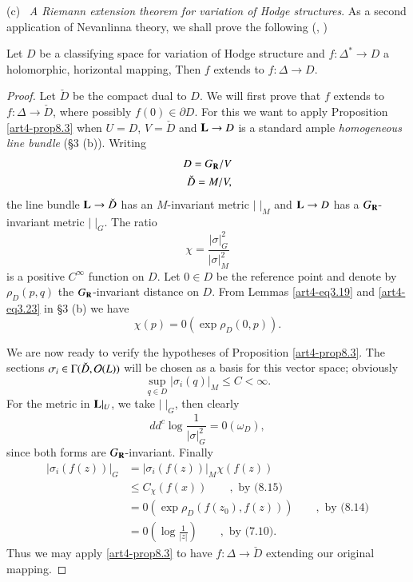 \noindent
(c)~ \textit{A Riemann extension theorem for variation of Hodge structures}. As a second application of Nevanlinna theory, we shall prove the following (\cf \cite{art4-key19}, \cite{art4-key41})

\setcounter{proposition}{12}
\begin{proposition}\label{art4-prop8.13}
Let $D$ be a classifying space for variation of Hodge structure and $f : \Delta^\ast \to D$ a holomorphic, horizontal mapping, Then $f$ extends to $f: \Delta \to D$.
\end{proposition}

\begin{proof}
Let $\check{D}$ be the compact dual to $D$. We will first prove that $f$ extends to $f : \Delta \to \check{D}$, where possibly $f(0) \in \partial D$. For this we want to apply Proposition \eqref{art4-prop8.3} when $U = D$, $V = \check{D}$ and $\mathbf{L}\to D$ is a standard ample \textit{homogeneous line bundle} (\cf \S 3 (b)). Writing 
\begin{align*}
D = G_{\mathbf{R}} / V\\
\check{D} = M/V,
\end{align*}\pageoriginale
the line bundle $\mathbf{L} \to \check{D}$ has an $M$-invariant metric $|\;|_M$ and $\mathbf{L} \to D$ has a $G_{\mathbf{R}}$-invariant metric $|\;|_G$. The ratio
$$
\chi = \frac{|\sigma|^2_G}{|\sigma|^2_M}
$$
is a positive $C^\infty$ function on $D$. Let $0 \in D$ be the reference point and denote by $\rho_D (p,q)$ the $G_{\mathbf{R}}$-invariant distance on $D$. From Lemmas \ref{art4-eq3.19} and \ref{art4-eq3.23} in \S 3 (b) we have 
\setcounter{equation}{13}
\begin{equation}
\chi(p) = 0 (\exp \rho_D (0, p)) . 
\label{art4-eq8.14}
\end{equation}

We are now ready to verify the hypotheses of Proposition \ref{art4-prop8.3}. The sections $\sigma_i \in \Gamma (\check{D}, \mathcal{O} (L))$ will be chosen as a basis for this vector space; obviously
\begin{equation}
\sup_{q \in D} |\sigma_i (q)|_M \leqslant C < \infty. 
\label{art4-eq8.15}
\end{equation}
For the metric in $\mathbf{L}|_U$, we take $|\;|_G$, then  clearly
$$
dd^c \log \frac{1}{|\sigma|^2_G} = 0 (\omega_D),
$$
since both forms are $G_{\mathbf{R}}$-invariant. Finally
\begin{align*}
|\sigma_i (f(z))|_G & = |\sigma_i (f(z))|_{M} \chi (f(z))\\
& \leqslant C_\chi (f(x)) \qquad , \text{ by (8.15)}\\
& = 0 (\exp \rho_D (f(z_0), f(z))) \qquad , \text{ by (8.14)}\\
& = 0 \left( \log \frac{1}{|z|}\right) \qquad, \text{ by (7.10)}.
\end{align*}
Thus we may apply \eqref{art4-prop8.3} to have $f: \Delta \to \check{D}$ extending our original mapping.


\end{proof}
